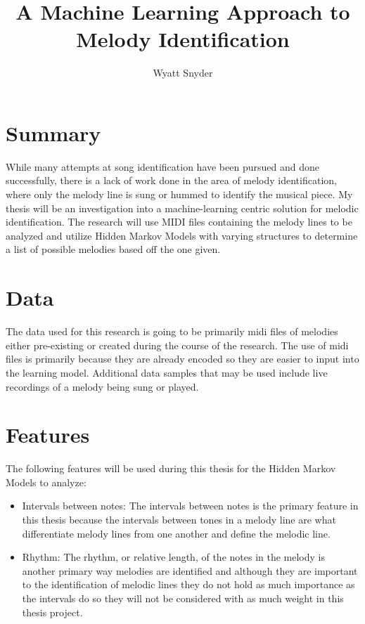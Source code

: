 \documentclass{article}
\title{A Machine Learning Approach to Melody Identification}
\author{Wyatt Snyder}
\begin{document}
	\maketitle
	\section{Summary}
	While many attempts at song identification have been pursued and done successfully,
	there is a lack of work done in the area of melody identification, where only the melody
	line is sung or hummed to identify the musical piece. My thesis will be an investigation
	into a machine-learning centric solution for melodic identification. The research will use 
	MIDI files containing the melody lines to be analyzed and utilize Hidden Markov Models with
	varying structures to determine a list of possible melodies based off the one given.
	
	\section{Data}
	The data used for this research is going to be primarily midi files of melodies either 
	pre-existing or created during the course of the research. The use of midi files is primarily 
	because they are already encoded so they are easier to input into the learning model. Additional 
	data samples that may be used include live recordings of a melody being sung or played.
	
	\section{Features}
	The following features will be used during this thesis for the Hidden Markov Models to analyze:
	\begin{itemize}
		\item Intervals between notes: The intervals between notes is the primary feature in this 
		thesis because the intervals between tones in a melody line are what differentiate melody lines 
		from one another and define the melodic line. 
		
		\item Rhythm: The rhythm, or relative length, of the notes in the melody is another primary way 
		melodies are identified and although they are important to the identification of melodic lines
		they do not hold as much importance as the intervals do so they will not be considered with as
		much weight in this thesis project.
	\end{itemize} 
	
\end{document}
